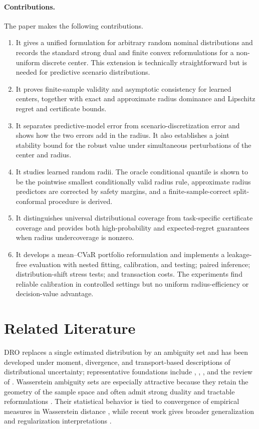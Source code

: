\documentclass[11pt]{article}
\newcommand{\1}{\mathbf{1}}
\begin{document}
\paragraph{Contributions.} The paper makes the following contributions.
\begin{enumerate}[leftmargin=2em]
    \item It gives a unified formulation for arbitrary random nominal distributions and records the standard strong dual and finite convex reformulations for a non-uniform discrete center. This extension is technically straightforward but is needed for predictive scenario distributions.
    \item It proves finite-sample validity and asymptotic consistency for learned centers, together with exact and approximate radius dominance and Lipschitz regret and certificate bounds.
    \item It separates predictive-model error from scenario-discretization error and shows how the two errors add in the radius. It also establishes a joint stability bound for the robust value under simultaneous perturbations of the center and radius.
    \item It studies learned random radii. The oracle conditional quantile is shown to be the pointwise smallest conditionally valid radius rule, approximate radius predictors are corrected by safety margins, and a finite-sample-correct split-conformal procedure is derived.
    \item It distinguishes universal distributional coverage from task-specific certificate coverage and provides both high-probability and expected-regret guarantees when radius undercoverage is nonzero.
    \item It develops a mean--CVaR portfolio reformulation and implements a leakage-free evaluation with nested fitting, calibration, and testing; paired inference; distribution-shift stress tests; and transaction costs. The experiments find reliable calibration in controlled settings but no uniform radius-efficiency or decision-value advantage.
\end{enumerate}

\section{Related Literature}

DRO replaces a single estimated distribution by an ambiguity set and has been developed under moment, divergence, and transport-based descriptions of distributional uncertainty; representative foundations include \citet{bental2013robust}, \citet{delage2010distributionally}, \citet{wiesemann2014distributionally}, and the review of \citet{rahimian2022frameworks}. Wasserstein ambiguity sets are especially attractive because they retain the geometry of the sample space and often admit strong duality and tractable reformulations \citep{esfahani2018data,gao2023distributionally,blanchet2019quantifying,kuhn2019wasserstein}. Their statistical behavior is tied to convergence of empirical measures in Wasserstein distance \citep{fournier2015rate,weed2019sharp}, while recent work gives broader generalization and regularization interpretations \citep{wu2025generalization}.
\end{document}
